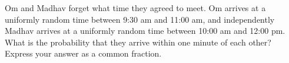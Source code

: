 Om and Madhav forget what time they agreed to meet. Om arrives at a uniformly random time between 9:30 am and 11:00 am, and independently Madhav arrives at a uniformly random time between 10:00 am and 12:00 pm. What is the probability that they arrive within one minute of each other? Express your answer as a common fraction.
